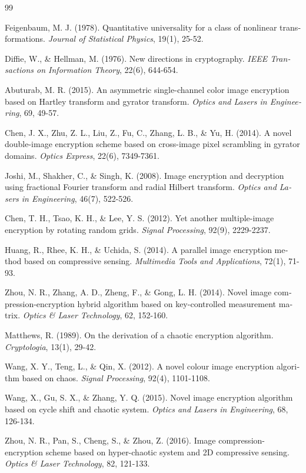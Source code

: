 \begin{thebibliography}{99}
\begin{LTRbibitems}
\begin{latin}
 Feigenbaum, M. J. (1978). Quantitative universality for a class of nonlinear transformations. \textit{Journal of Statistical Physics}, 19(1), 25-52.

 Diffie, W., \& Hellman, M. (1976). New directions in cryptography. \textit{IEEE Transactions on Information Theory}, 22(6), 644-654.

 Abuturab, M. R. (2015). An asymmetric single-channel color image encryption based on Hartley transform and gyrator transform. \textit{Optics and Lasers in Engineering}, 69, 49-57.

 Chen, J. X., Zhu, Z. L., Liu, Z., Fu, C., Zhang, L. B., \& Yu, H. (2014). A novel double-image encryption scheme based on cross-image pixel scrambling in gyrator domains. \textit{Optics Express}, 22(6), 7349-7361.

 Joshi, M., Shakher, C., \& Singh, K. (2008). Image encryption and decryption using fractional Fourier transform and radial Hilbert transform. \textit{Optics and Lasers in Engineering}, 46(7), 522-526.

 Chen, T. H., Tsao, K. H., \& Lee, Y. S. (2012). Yet another multiple-image encryption by rotating random grids. \textit{Signal Processing}, 92(9), 2229-2237.

 Huang, R., Rhee, K. H., \& Uchida, S. (2014). A parallel image encryption method based on compressive sensing. \textit{Multimedia Tools and Applications}, 72(1), 71-93.

 Zhou, N. R., Zhang, A. D., Zheng, F., \& Gong, L. H. (2014). Novel image compression-encryption hybrid algorithm based on key-controlled measurement matrix. \textit{Optics \& Laser Technology}, 62, 152-160.

 Matthews, R. (1989). On the derivation of a chaotic encryption algorithm. \textit{Cryptologia}, 13(1), 29-42.

 Wang, X. Y., Teng, L., \& Qin, X. (2012). A novel colour image encryption algorithm based on chaos. \textit{Signal Processing}, 92(4), 1101-1108.

 Wang, X., Gu, S. X., \& Zhang, Y. Q. (2015). Novel image encryption algorithm based on cycle shift and chaotic system. \textit{Optics and Lasers in Engineering}, 68, 126-134.

 Zhou, N. R., Pan, S., Cheng, S., \& Zhou, Z. (2016). Image compression-encryption scheme based on hyper-chaotic system and 2D compressive sensing. \textit{Optics \& Laser Technology}, 82, 121-133.


\end{latin}
\end{LTRbibitems}
\end{thebibliography}
